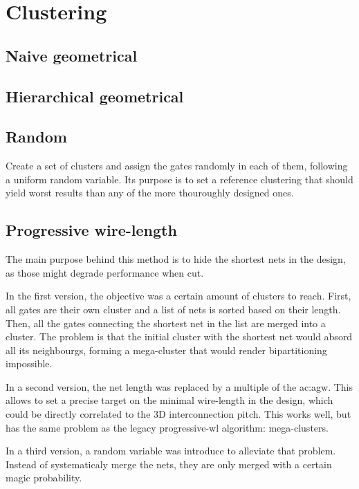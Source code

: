 \section{Clustering}

\subsection{Naive geometrical}

\subsection{Hierarchical geometrical}

\subsection{Random}
Create a set of clusters and assign the gates randomly in each of them, following a uniform random variable.
Its purpose is to set a reference clustering that should yield worst results than any of the more thouroughly designed ones.

\subsection{Progressive wire-length}
The main purpose behind this method is to hide the shortest nets in the design, as those might degrade performance when cut.

In the first version, the objective was a certain amount of clusters to reach.
First, all gates are their own cluster and a list of nets is sorted based on their length.
Then, all the gates connecting the shortest net in the list are merged into a cluster.
The problem is that the initial cluster with the shortest net would absord all its neighbourgs, forming a mega-cluster that would render bipartitioning impossible.

In a second version, the net length was replaced by a multiple of the \gls{ac:agw}.
This allows to set a precise target on the minimal wire-length in the design, which could be directly correlated to the 3D interconnection pitch.
This works well, but has the same problem as the legacy progressive-wl algorithm: mega-clusters.

In a third version, a random variable was introduce to alleviate that problem.
Instead of systematicaly merge the nets, they are only merged with a certain magic probability.


